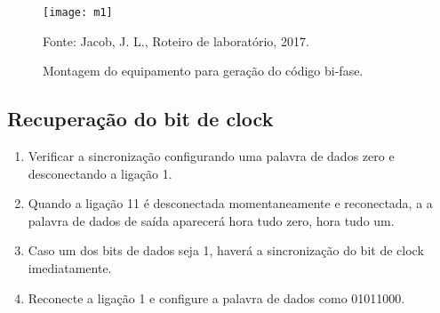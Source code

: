             \begin{figure}[H]
                \centering
                \caption{Montagem do equipamento para geração do código bi-fase.}
                \texttt{[image: m1]}
                
                \small Fonte: Jacob, J. L., Roteiro de laboratório, 2017.
                \label{fig:m1}
            \end{figure}
            
        \subsection{Recuperação do bit de clock}
                        
            \begin{enumerate}
                \item Verificar a sincronização configurando uma palavra de dados zero e desconectando a ligação 1.
                
                \item Quando a ligação 11 é desconectada momentaneamente e reconectada, a a palavra de dados de saída aparecerá hora tudo zero, hora tudo um.
                
                \item Caso um dos bits de dados seja 1, haverá a sincronização do bit de clock imediatamente.
                
                \item Reconecte a ligação 1 e configure a palavra de dados como 01011000.
            \end{enumerate}
            
            
